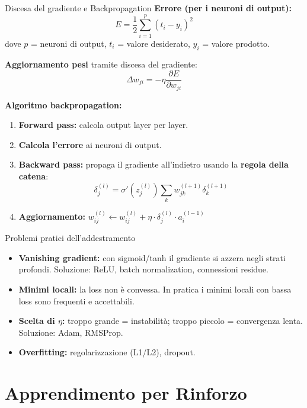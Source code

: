 \documentclass[12pt,a4paper]{article}
\begin{document}
\begin{formulabox}{Discesa del gradiente e Backpropagation}
\textbf{Errore (per i neuroni di output):}
\[
E = \frac{1}{2} \sum_{i=1}^{p} (t_i - y_i)^2
\]
dove $p$ = neuroni di output, $t_i$ = valore desiderato, $y_i$ = valore prodotto.

\textbf{Aggiornamento pesi} tramite discesa del gradiente:
\[
\Delta w_{ji} = -\eta \frac{\partial E}{\partial w_{ji}}
\]

\textbf{Algoritmo backpropagation:}
\begin{enumerate}[noitemsep]
  \item \textbf{Forward pass:} calcola output layer per layer.
  \item \textbf{Calcola l'errore} ai neuroni di output.
  \item \textbf{Backward pass:} propaga il gradiente all'indietro usando la \textbf{regola della catena}:
  \[
  \delta_j^{(l)} = \sigma'(z_j^{(l)}) \sum_k w_{jk}^{(l+1)} \delta_k^{(l+1)}
  \]
  \item \textbf{Aggiornamento:} $w_{ij}^{(l)} \leftarrow w_{ij}^{(l)} + \eta \cdot \delta_j^{(l)} \cdot a_i^{(l-1)}$
\end{enumerate}
\end{formulabox}

\begin{warnbox}{Problemi pratici dell'addestramento}
\begin{itemize}[noitemsep]
  \item \textbf{Vanishing gradient:} con sigmoid/tanh il gradiente si azzera negli strati profondi. Soluzione: ReLU, batch normalization, connessioni residue.
  \item \textbf{Minimi locali:} la loss non è convessa. In pratica i minimi locali con bassa loss sono frequenti e accettabili.
  \item \textbf{Scelta di $\eta$:} troppo grande = instabilità; troppo piccolo = convergenza lenta. Soluzione: Adam, RMSProp.
  \item \textbf{Overfitting:} regolarizzazione (L1/L2), dropout.
\end{itemize}
\end{warnbox}

\section{Apprendimento per Rinforzo}
\end{document}
